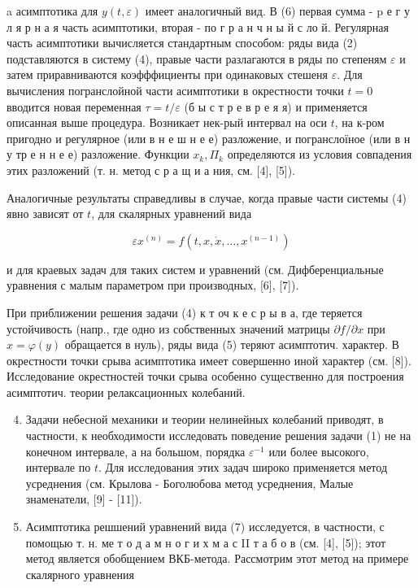 \documentclass[10pt]{article}
\begin{document}
a асимптотика для $y(t, \varepsilon)$ имеет аналогичный вид. В (6) первая сумма - p е г у л я р н а я часть асимптотики, вторая - по г р а н ч н ы й с ло й. Регулярная часть асимптотики вычисляется стандартным способом: ряды вида (2) подставляются в систему (4), правые части разлагаются в ряды по степеням $\varepsilon$ и затем приравниваются коэфффициенты при одинаковых стешеня $\varepsilon$. Для вычисления погранслойной части асимптотики в окрестности точки $t=0$ вводится новая переменная $\tau=t / \varepsilon$ (б ы с т р е в р е я я) и применяется описанная выше процедура. Возникает нек-рый интервал на оси $t$, на к-ром пригодно и регулярное (или в н е ш н е е) разложение, и погранслоїное (или в н у тр е н н е е) разложение. Функции $x_{k}, \Pi_{k}$ определяются из условия совпадения этих разложений (т. н. метод с р а щ и а ния, см. [4], [5]).



Аналогичные результаты справедливы в случае, когда правые части системы (4) явно зависят от $t$, для скалярных уравнений вида



\[

\varepsilon x^{(n)}=f\left(t, x, \dot{x}, \ldots, x^{(n-1)}\right)

\]



и для краевых задач для таких систем и уравнений (см. Дифберенциальные уравнения с малым параметром при производных, [6], [7]).



При приближении решения задачи (4) к т оч к е с р ы в а, где теряется устойчивость (напр., где одно из собственных значений матрицы $\partial f / \partial x$ при $x=\varphi(y)$ обращается в нуль), ряды вида (5) теряют асимптотич. характер. В окрестности точки срыва асимптотика имеет совершенно иной характер (см. [8]). Исследование окрестностей точки срыва особенно существенно для построения асимптотич. теории релаксационных колебаний.



\begin{enumerate}

  \setcounter{enumi}{3}

  \item Задачи небесной механики и теории нелинейных колебаний приводят, в частности, к необходимости исследовать поведение решения задачи (1) не на конечном интервале, а на большом, порядка $\varepsilon^{-1}$ или более высокого, интервале по $t$. Для исследования этих задач широко применяется метод усреднения (см. Крылова - Боголюбова метод усреднения, Малые знаменатели, [9] - [11]).



  \item Асимптотика решшений уравнений вида (7) исследуется, в частности, с помощью т. н. ме т о д а м н о г и х м а с II т а б о в (см. [4], [5]); этот метод является обобщением ВКБ-метода. Рассмотрим этот метод на примере скалярного уравнения



\end{enumerate}
\end{document}
